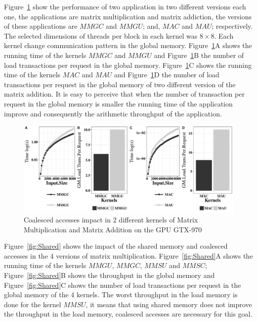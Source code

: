 Figure~\ref{fig:Coalesced} show the performance of two application in two different versions each one, the applications are matrix multiplication and matrix addiction, the versions  of these applications are $MMGC$ and $MMGU$; and, $MAC$ and $MAU$; respectively. The selected dimensions of threads per block in each kernel was $8\times{}8$. Each kernel change communication pattern in the global memory. Figure~\ref{fig:Coalesced}A shows the running time of the kernels $MMGC$ and $MMGU$ and Figure~\ref{fig:Coalesced}B the number of load transactions per request in the global memory. Figure~\ref{fig:Coalesced}C shows the running time of the kernels $MAC$ and $MAU$ and Figure~\ref{fig:Coalesced}D the number of load transactions per request in the global memory of two different version of the matrix addition. It is easy to perceive that when the number of transaction per request in the global memory is smaller the running time of the application improve and consequently the arithmetic throughput of the application.

\begin{figure}[htpb]
	\centering
    \includegraphics[scale=.5]{images/plotCoalesced.pdf}
    \caption{Coalesced accesses impact in 2 different kernels of Matrix Multiplication and Matrix Addition on the GPU GTX-970}
    \label{fig:Coalesced}
\end{figure}

Figure~\ref{fig:Shared} shows the impact of the shared memory and coalesced accesses in the 4 versions of matrix multiplication. Figure~\ref{fig:Shared}A shows the running time of the kernels $MMGU$, $MMGC$, $MMSU$ and $MMSC$; Figure~\ref{fig:Shared}B shows the throughput in the global memory and Figure~\ref{fig:Shared}C shows the number of load transactions per request in the global memory of the 4 kernels. The worst throughput in the load memory is done for the kernel $MMSU$, it means that using shared memory does not improve the throughput  in the load memory, coalesced accesses are necessary for this goal.


